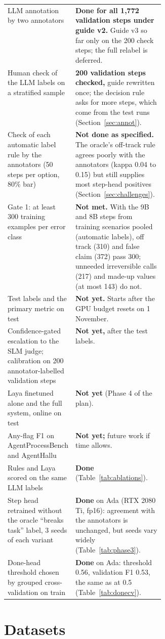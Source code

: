 \documentclass[10.5pt,a4paper]{article}
\begin{document}
{\begin{xltabular}{\linewidth}{P{0.36\linewidth}Y}
LLM annotation by two annotators & \textbf{Done for all 1,772 validation steps under guide v2.} Guide v3 so far only on the 200 check steps; the full relabel is deferred. \\
Human check of the LLM labels on a stratified sample & \textbf{200 validation steps checked,} guide rewritten once; the decision rule asks for more steps, which come from the test runs (Section~\ref{sec:annot}). \\
Check of each automatic label rule by the annotators (50 steps per option, 80\% bar) & \textbf{Not done as specified.} The oracle's off-track rule agrees poorly with the annotators (kappa 0.04 to 0.15) but still supplies most step-head positives (Section~\ref{sec:challenges}). \\
Gate 1: at least 300 training examples per error class & \textbf{Not met.} With the 9B and 8B steps from training scenarios pooled (automatic labels), off track (310) and false claim (372) pass 300; unneeded irreversible calls (217) and made-up values (at most 143) do not. \\
Test labels and the primary metric on test & \textbf{Not yet.} Starts after the GPU budget resets on 1 November. \\
Confidence-gated escalation to the SLM judge; calibration on 200 annotator-labelled validation steps & \textbf{Not yet,} after the test labels. \\
Laya finetuned alone and the full system, online on test & \textbf{Not yet} (Phase 4 of the plan). \\
Any-flag F1 on AgentProcessBench and AgentHallu & \textbf{Not yet;} future work if time allows. \\
Rules and Laya scored on the same LLM labels & \textbf{Done} (Table~\ref{tab:ablations}). \\
Step head retrained without the oracle ``breaks task'' label, 3 seeds of each variant & \textbf{Done} on Ada (RTX 2080 Ti, fp16): agreement with the annotators is unchanged, but seeds vary widely (Table~\ref{tab:phase3}). \\
Done-head threshold chosen by grouped cross-validation on train & \textbf{Done} on Ada: threshold 0.56, validation F1 0.53, the same as at 0.5 (Table~\ref{tab:donecv}). \\
\bottomrule
\end{xltabular}}

\section{Datasets}\label{sec:datasets}
\end{document}

